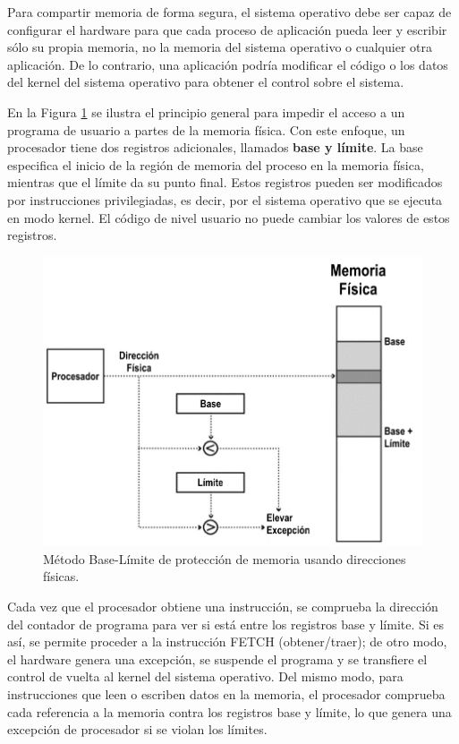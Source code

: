 \documentclass[10pt]{book}
\begin{document}
Para compartir memoria de forma segura, el sistema operativo debe ser capaz de configurar el hardware para que cada proceso de aplicación pueda leer y escribir sólo su propia memoria, no la memoria del sistema operativo o cualquier otra aplicación. De lo contrario, una aplicación podría modificar el código o los datos del kernel del sistema operativo para obtener el control sobre el sistema.

En la Figura \ref{fig04} se ilustra el principio general para impedir el acceso a un programa de usuario a partes de la memoria física. 
Con este enfoque, un procesador tiene dos registros adicionales, llamados \textbf{base y límite}. La base especifica el inicio de la región de memoria del proceso en la memoria física, mientras que el límite da su punto final. Estos registros pueden ser modificados por instrucciones privilegiadas, es decir, por el sistema operativo que se ejecuta en modo kernel. El código de nivel usuario no puede cambiar los valores de estos registros.

\begin{figure}[tbhp]
\centerline{\includegraphics[scale=0.55]{img/fig04}}
\caption{Método Base-Límite de protección de memoria usando direcciones físicas.}
\label{fig04}
\end{figure}

Cada vez que el procesador obtiene una instrucción, se comprueba la dirección del contador de programa para ver si está entre los registros base y límite. Si es así, se permite proceder a la instrucción FETCH (obtener/traer); de otro modo, el hardware genera una excepción, se suspende el programa y se transfiere el control de vuelta al kernel del sistema operativo. Del mismo modo, para instrucciones que leen o escriben datos en la memoria, el procesador comprueba cada referencia a la memoria contra los registros base y límite, lo que genera una excepción de procesador si se violan los límites.
\end{document}
